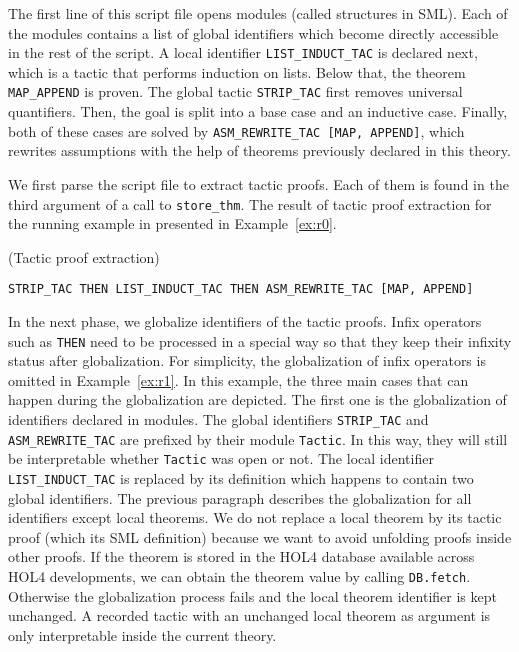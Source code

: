 \documentclass[runningheads,a4paper,draft]{svjour3}
\def\holfour{\textsf{HOL4}\xspace}
\def\sml{\textsf{SML}\xspace}
\begin{document}
The first line of this script file opens modules (called structures in \sml). Each of
the modules contains a list of global identifiers which become directly accessible in
the rest of the script.
A local identifier \texttt{LIST\_INDUCT\_TAC} is declared next, which is a
tactic that performs induction on lists. Below that, the theorem
\texttt{MAP\_APPEND} is proven.
The global tactic \texttt{STRIP\_TAC} first removes universal quantifiers. Then,
the goal is split into a base case and an inductive case. Finally, both
of these cases are solved by \texttt{ASM\_REWRITE\_TAC [MAP, APPEND]}, which
rewrites assumptions with the help of theorems previously declared in this
theory.

We first parse the script file to extract tactic proofs. Each of them is found in
the third argument of a call to \texttt{store\_thm}. The result of tactic proof
extraction for the running example in presented in Example~\ref{ex:r0}.

\begin{example}\label{ex:r0}(Tactic proof extraction)
\small
\begin{lstlisting}[language=SMLSmall]
STRIP_TAC THEN LIST_INDUCT_TAC THEN ASM_REWRITE_TAC [MAP, APPEND]
\end{lstlisting}
\end{example}

In the next phase, we globalize identifiers of the tactic proofs.
Infix operators such as \texttt{THEN} need to be processed in a special way so
that they keep their infixity status after globalization. For simplicity,
the
globalization of infix operators is omitted in Example~\ref{ex:r1}.
In this example, the three main cases that can happen during the globalization
are depicted. The first one is the globalization of identifiers declared in
modules. The global identifiers \texttt{STRIP\_TAC} and
\texttt{ASM\_REWRITE\_TAC} are prefixed by their module \texttt{Tactic}. In
this way, they will still be interpretable whether \texttt{Tactic} was open or
not. The local identifier \texttt{LIST\_INDUCT\_TAC} is replaced by its
definition which happens to contain two global identifiers.
The previous paragraph describes the globalization for all identifiers except
local theorems.  We do not replace a local
theorem by its tactic proof (which its \sml definition) because we want to 
avoid unfolding proofs inside other proofs.
If the theorem is stored in the \holfour database available across \holfour
developments, we can obtain the theorem value by calling \texttt{DB.fetch}.
Otherwise the globalization process fails and the local theorem identifier is
kept unchanged. A recorded tactic with an unchanged local theorem as argument
is only interpretable inside the current theory.
\end{document}
